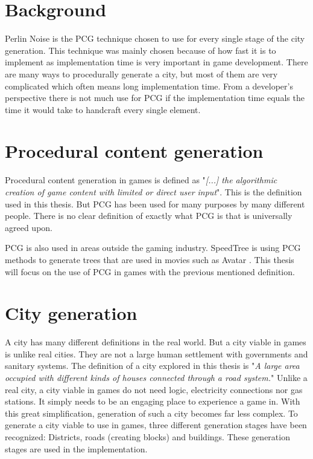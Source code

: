 	\section{Background}
	Perlin Noise is the PCG technique chosen to use for every single stage of the city generation. This technique was mainly chosen because of how fast it is to implement as implementation time is very important in game development.
	There are many ways to procedurally generate a city, but most of them are very complicated which often means long implementation time. From a developer's perspective there is not much use for PCG if the implementation time equals the time it would take to handcraft every single element.
	
	\section{Procedural content generation}
	Procedural content generation in games is defined as "\textit{[...] the algorithmic creation of game content with limited or direct user input}"\cite{WhatIsPCG}. This is the definition used in this thesis. But PCG has been used for many purposes by many different people. There is no clear definition of exactly what PCG is that is universally agreed upon.\cite{WhatIsPCG}
	
	PCG is also used in areas outside the gaming industry. SpeedTree \cite{SpeedTree} is using PCG methods to generate trees that are used in movies such as Avatar \cite{SpeedTreeMovies}.
	This thesis will focus on the use of PCG in games with the previous mentioned definition.
	
	\section{City generation}
	A city has many different definitions in the real world. But a city viable in games is unlike real cities. They are not a large human settlement with governments and sanitary systems. The definition of a city explored in this thesis is "\textit{A large area occupied with different kinds of houses connected through a road system.}"
	Unlike a real city, a city viable in games do not need logic, electricity connections nor gas stations. It simply needs to be an engaging place to experience a game in. With this great simplification, generation of such a city becomes far less complex.
	To generate a city viable to use in games, three different generation stages have been recognized: Districts, roads (creating blocks) and buildings. These generation stages are used in the implementation.
	
